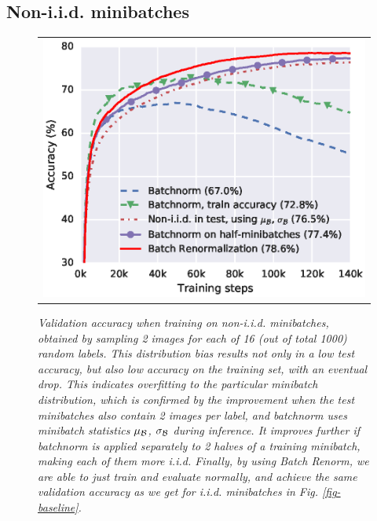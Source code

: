 

\subsection{Non-i.i.d. minibatches}
\begin{figure}[t]
    \centering
    \begin{tabular}{@{}c@{}}
\includegraphics[width=\columnwidth]{biased.eps}
\end{tabular} 
    \caption{\em Validation accuracy when training on non-i.i.d. minibatches, obtained by sampling 2 images for each of 16 (out of total 1000) random labels. This distribution bias results not only in a low test accuracy, but also low accuracy on the training set, with an eventual drop. This indicates overfitting to the particular minibatch distribution, which is confirmed by the improvement when the test minibatches also contain 2 images per label, and batchnorm uses minibatch statistics $\mu_{\mathcal{B}}$, $\sigma_{\mathcal{B}}$ during inference. It improves further if batchnorm is applied separately to 2 halves of a training minibatch, making each of them more i.i.d. Finally, by using Batch Renorm, we are able to just train and evaluate normally, and achieve the same validation accuracy as we get for i.i.d. minibatches in Fig. \ref{fig-baseline}.
    }
    \label{fig-biased}
\end{figure}

